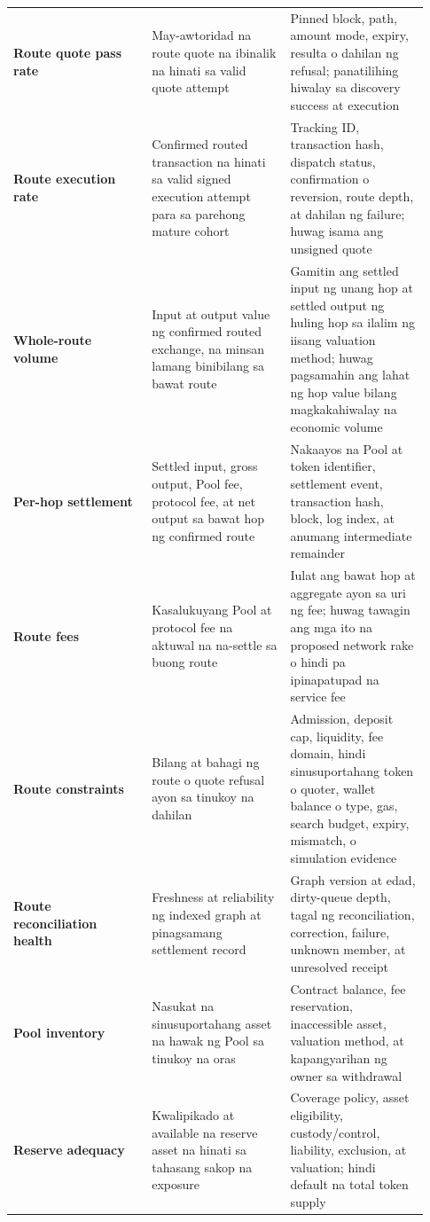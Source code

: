 \documentclass[11pt]{article}
\begin{document}
\begin{longtable}{P{0.31\linewidth} P{0.31\linewidth} P{0.31\linewidth}}
\textbf{Route quote pass rate} & May-awtoridad na route quote na ibinalik na hinati sa valid quote attempt & Pinned block, path, amount mode, expiry, resulta o dahilan ng refusal; panatilihing hiwalay sa discovery success at execution \\
\textbf{Route execution rate} & Confirmed routed transaction na hinati sa valid signed execution attempt para sa parehong mature cohort & Tracking ID, transaction hash, dispatch status, confirmation o reversion, route depth, at dahilan ng failure; huwag isama ang unsigned quote \\
\textbf{Whole-route volume} & Input at output value ng confirmed routed exchange, na minsan lamang binibilang sa bawat route & Gamitin ang settled input ng unang hop at settled output ng huling hop sa ilalim ng iisang valuation method; huwag pagsamahin ang lahat ng hop value bilang magkakahiwalay na economic volume \\
\textbf{Per-hop settlement} & Settled input, gross output, Pool fee, protocol fee, at net output sa bawat hop ng confirmed route & Nakaayos na Pool at token identifier, settlement event, transaction hash, block, log index, at anumang intermediate remainder \\
\textbf{Route fees} & Kasalukuyang Pool at protocol fee na aktuwal na na-settle sa buong route & Iulat ang bawat hop at aggregate ayon sa uri ng fee; huwag tawagin ang mga ito na proposed network rake o hindi pa ipinapatupad na service fee \\
\textbf{Route constraints} & Bilang at bahagi ng route o quote refusal ayon sa tinukoy na dahilan & Admission, deposit cap, liquidity, fee domain, hindi sinusuportahang token o quoter, wallet balance o type, gas, search budget, expiry, mismatch, o simulation evidence \\
\textbf{Route reconciliation health} & Freshness at reliability ng indexed graph at pinagsamang settlement record & Graph version at edad, dirty-queue depth, tagal ng reconciliation, correction, failure, unknown member, at unresolved receipt \\
\textbf{Pool inventory} & Nasukat na sinusuportahang asset na hawak ng Pool sa tinukoy na oras & Contract balance, fee reservation, inaccessible asset, valuation method, at kapangyarihan ng owner sa withdrawal \\
\textbf{Reserve adequacy} & Kwalipikado at available na reserve asset na hinati sa tahasang sakop na exposure & Coverage policy, asset eligibility, custody/control, liability, exclusion, at valuation; hindi default na total token supply \\

\end{longtable}
\end{document}

